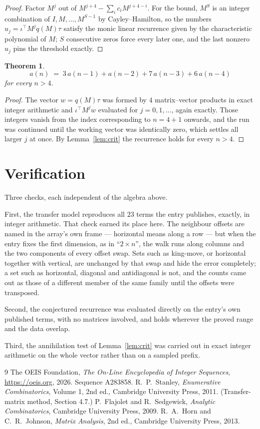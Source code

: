 \documentclass[11pt,a4paper]{article}
\theoremstyle{plain}
\newtheorem{theorem}{Theorem}
\theoremstyle{definition}
\begin{document}
\begin{proof}
Factor $M^{j}$ out of $M^{j+4}-\sum_ic_iM^{j+4-i}$. For the bound, $M^{S}$
is an integer combination of $I,M,\dots,M^{S-1}$ by Cayley--Hamilton, so the numbers
$u_j=\iota^{\!\top}M^{j}q(M)\tau$ satisfy the monic linear recurrence given by the
characteristic polynomial of $M$; $S$ consecutive zeros force every later one, and the last
nonzero $u_j$ pins the threshold exactly.
\end{proof}

\begin{theorem}
\[
a(n)\;=\;3\,a(n-1) + a(n-2) + 7\,a(n-3) + 6\,a(n-4)
\]
for every $n>4$.
\end{theorem}

\begin{proof}
The vector $w=q(M)\tau$ was formed by $4$ matrix--vector products in exact integer
arithmetic and $\iota^{\!\top}M^{j}w$ evaluated for $j=0,1,\dots$, again exactly. Those
integers vanish from the index corresponding to $n=4+1$ onwards, and the run was
continued until the working vector was identically zero, which settles all larger $j$ at once.
By Lemma~\ref{lem:crit} the recurrence holds for every $n>4$.
\end{proof}

\section{Verification}

Three checks, each independent of the algebra above.

First, the transfer model reproduces all $23$ terms the entry publishes, exactly, in
integer arithmetic. That check earned its place here. The neighbour offsets are named in the
array's own frame --- horizontal means along a row --- but when the entry fixes the first
dimension, as in ``$2\times n$'', the walk runs along columns and the two components of every
offset swap. Sets such as king-move, or horizontal together with vertical, are unchanged by
that swap and hide the error completely; a set such as horizontal, diagonal and antidiagonal
is not, and the counts came out as those of a different member of the same family until the
offsets were transposed.

Second, the conjectured recurrence was evaluated directly on the entry's own published terms,
with no matrices involved, and holds wherever the proved range and the data overlap.

Third, the annihilation test of Lemma~\ref{lem:crit} was carried out in exact integer
arithmetic on the whole vector rather than on a sampled prefix.

\begin{thebibliography}{9}
 The OEIS Foundation, \emph{The On-Line Encyclopedia of Integer
Sequences}, \url{https://oeis.org}, 2026. Sequence A283858.
 R.~P.~Stanley, \emph{Enumerative Combinatorics}, Volume 1, 2nd ed.,
Cambridge University Press, 2011. (Transfer-matrix method, Section 4.7.)
 P.~Flajolet and R.~Sedgewick, \emph{Analytic Combinatorics}, Cambridge
University Press, 2009.
 R.~A.~Horn and C.~R.~Johnson, \emph{Matrix Analysis}, 2nd ed., Cambridge
University Press, 2013.
\end{thebibliography}
\end{document}
